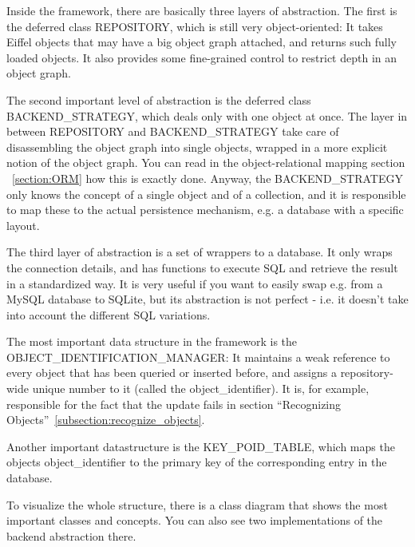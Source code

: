 Inside the framework, there are basically three layers of abstraction. The first is the deferred class REPOSITORY, which is still very object-oriented:
It takes Eiffel objects that may have a big object graph attached, and returns such fully loaded objects. 
It also provides some fine-grained control to restrict depth in an object graph.

The second important level of abstraction is the deferred class BACKEND\_STRATEGY, which deals only with one object at once. 
The layer in between REPOSITORY and BACKEND\_STRATEGY take care of disassembling the object graph into single objects, wrapped in a more explicit notion of the object graph. 
You can read in the object-relational mapping section ~\ref{section:ORM} how this is exactly done.
Anyway, the BACKEND\_STRATEGY only knows the concept of a single object and of a collection, and it is responsible to map these to the actual persistence mechanism, e.g. a database with a specific layout. 

The third layer of abstraction is a set of wrappers to a database. It only wraps the connection details, and has functions to execute SQL and retrieve the result in a standardized way.
It is very useful if you want to easily swap e.g. from a MySQL database to SQLite, but its abstraction is not perfect - i.e. it doesn't take into account the different SQL variations.

The most important data structure in the framework is the OBJECT\_\-IDENTIFICATION\_MANAGER: 
It maintains a weak reference to every object that has been queried or inserted before, and assigns a repository-wide unique number to it (called the object\_identifier).
It is, for example, responsible for the fact that the update fails in section ``Recognizing Objects''~\ref{subsection:recognize_objects}.

Another important datastructure is the KEY\_POID\_TABLE, which maps the objects object\_identifier to the primary key of the corresponding entry in the database.

To visualize the whole structure, there is a class diagram that shows the most important classes and concepts. You can also see two implementations of the backend abstraction there.

